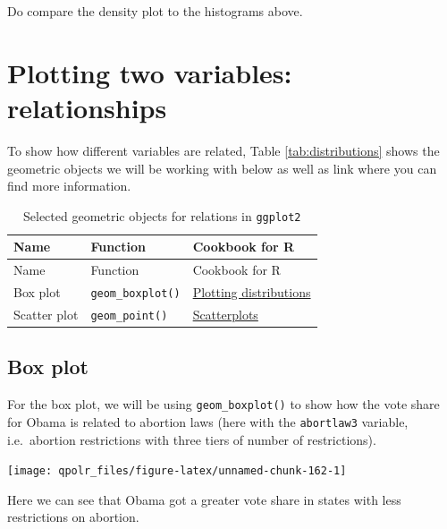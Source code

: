 \documentclass[12pt,oneside]{reedthesis}
\theoremstyle{definition}
\theoremstyle{definition}
\theoremstyle{definition}
\theoremstyle{remark}
\begin{document}
  Do compare the density plot to the histograms above.
  
  \section{Plotting two variables:
  relationships}\label{plotting-two-variables-relationships}
  
  To show how different variables are related, Table
  \ref{tab:distributions} shows the geometric objects we will be working
  with below as well as link where you can find more information.
  \begin{longtable}[]{@{}lll@{}}
  \caption{\label{tab:relationships} Selected geometric objects for relations
  in \texttt{ggplot2}}\tabularnewline
  \toprule
  Name & Function & Cookbook for R\tabularnewline
  \midrule
  \endfirsthead
  \toprule
  Name & Function & Cookbook for R\tabularnewline
  \midrule
  \endhead
  Box plot & \texttt{geom\_boxplot()} &
  \href{http://www.cookbook-r.com/Graphs/Plotting_distributions_(ggplot2)/}{Plotting
  distributions}\tabularnewline
  Scatter plot & \texttt{geom\_point()} &
  \href{http://www.cookbook-r.com/Graphs/Scatterplots_(ggplot2)/}{Scatterplots}\tabularnewline
  \bottomrule
  \end{longtable}
  \subsection{Box plot}\label{box-plot}
  
  For the box plot, we will be using \texttt{geom\_boxplot()} to show how
  the vote share for Obama is related to abortion laws (here with the
  \texttt{abortlaw3} variable, i.e.~abortion restrictions with three tiers
  of number of restrictions).
  \begin{Shaded}
  \begin{Highlighting}[]
  \NormalTok{(}\OperatorTok{+}
  \StringTok{  }\NormalTok{() }
  \end{Highlighting}
  \end{Shaded}
  \begin{center}\texttt{[image: qpolr\_files/figure-latex/unnamed-chunk-162-1]} \end{center}
  
  Here we can see that Obama got a greater vote share in states with less
  restrictions on abortion.
  
\end{document}
